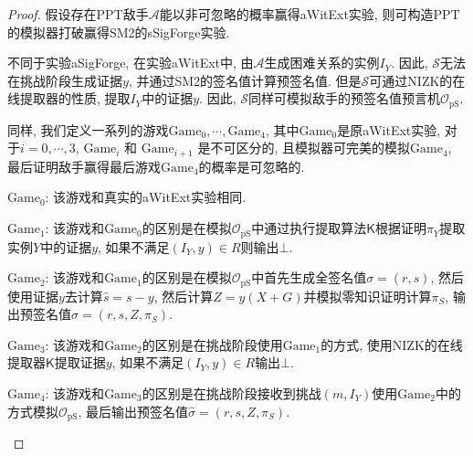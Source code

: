 \documentclass[review]{jcr}
\begin{document}
\begin{proof}

假设存在PPT敌手$\mathcal{A}$能以非可忽略的概率赢得aWitExt实验, 则可构造PPT的模拟器打破赢得SM2的sSigForge实验. 

不同于实验aSigForge, 在实验aWitExt中, 由$\mathcal{A}$生成困难关系的实例$I_Y$. 因此, $\mathcal{S}$无法在挑战阶段生成证据$y$, 并通过SM2的签名值计算预签名值. 但是$\mathcal{S}$可通过NIZK的在线提取器的性质, 提取$I_Y$中的证据$y$. 因此, $\mathcal{S}$同样可模拟敌手的预签名值预言机$\mathcal{O}_{\text{pS}}$. 

同样, 我们定义一系列的游戏$\text{Game}_0,\cdots,\text{Game}_4$, 其中$\text{Game}_0$是原aWitExt实验, 对于$i = 0,\cdots,3$,  $\text{Game}_i$ 和 $\text{Game}_{i+1}$ 是不可区分的, 且模拟器可完美的模拟$\text{Game}_4$, 最后证明敌手赢得最后游戏$\text{Game}_4$的概率是可忽略的. 

\begin{trivlist}
\item $\text{Game}_0$: 该游戏和真实的aWitExt实验相同. 
\end{trivlist}

\begin{trivlist}
\item $\text{Game}_1$: 该游戏和$\text{Game}_0$的区别是在模拟$\mathcal{O}_{\text{pS}}$中通过执行提取算法$\mathsf{K}$根据证明$\pi_Y$提取实例$Y$中的证据$y$, 如果不满足$(I_Y, y) \in R$则输出$\bot$. 
\end{trivlist}

\begin{trivlist}
\item $\text{Game}_2$: 该游戏和$\text{Game}_1$的区别是在模拟$\mathcal{O}_{\text{pS}}$中首先生成全签名值$\sigma=(r,s)$, 然后使用证据$y$去计算$\hat{s}=s-y$, 然后计算$Z=y(X+G)$并模拟零知识证明计算$\pi_S$, 输出预签名值$\hat{\sigma}=(r,s,Z,\pi_S)$. 
\end{trivlist}

\begin{trivlist}
\item $\text{Game}_3$: 该游戏和$\text{Game}_2$的区别是在挑战阶段使用$\text{Game}_1$的方式, 使用NIZK的在线提取器$\mathsf{K}$提取证据$y$, 如果不满足$(I_Y,y) \in R$输出$\bot$. 
\end{trivlist}

\begin{trivlist}
\item $\text{Game}_4$: 该游戏和$\text{Game}_3$的区别是在挑战阶段接收到挑战$(m, I_Y)$使用$\text{Game}_2$中的方式模拟$\mathcal{O}_{\text{pS}}$, 最后输出预签名值$\hat{\sigma}=(r,s,Z,\pi_S)$. 
\end{trivlist}


\end{proof}
\end{document}

